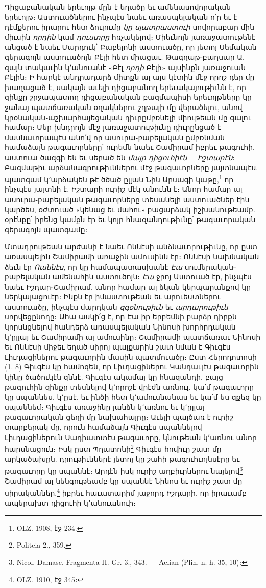 \documentclass{article}
\begin{document}
{Դիցաբանական երեւոյթ մըն է եղածը եւ ամենասովորական երեւոյթ։ Աստուածներու ինչպէս նաեւ առասպելական ո՛ր եւ է դէմքերու իրարու հետ ձուլումը \emph{կը սլատրաստուի} սովորաբար մին միւսին \emph{որդին} կամ \emph{դուստրը} հռչակելով։ Միեւնոյն յառաջատութենէ անցած է նաեւ Մարդուկ՝ Բաբելոնի աստուածը, որ յետոյ Սեմական գերագոյն աստուածոյն Բէլի հետ միացաւ. Թագղաթ֊բաղսար Ա. զայն տակաւին կ՚անուանէ «Բէլ \emph{որդի} Բէլի» այսինքն յառաջուան Բէլին։ Ի հարկէ անդրադարձ միտքն ալ այս կէտին մէջ որոշ դեր մը խաղացաձ է, սակայն աւելի դիցաբանող երեւակայութիւնն է, որ զինքը շրջապատող դիցաբանական բազմապիսի երեւոյթները կը ջանայ պատճառական օղակներու շղթայի մը վերածելու, անով կրօնական֊աշխարհայեցական դիւրըմբռնելի միութեան մը գալու համար։ Մեր խնդրոյն մէջ յառաջատութիւնը դիւրընցած է մասնաւորապէս անո՛վ որ ասուրա֊բաբելական ըմբռնման համաձայն թագաւորները՝ ուրեմն նաեւ Շամիրամ իբրեւ թագուհի, աստուա ծազգի են եւ սերած են \emph{մայր դիցուհիէն} = \emph{Իշտարէն}։ Բազմաթիւ արձանագրութիւններու մէջ թագաւորները յայտնապէս. պատգամ կ՚արձակեն թէ ծծած ըլլան Նին Արսագի կաթը,\footnote{OLZ. 1908, էջ 234.} որ ինչպէս յայտնի է, Իշտարի ուրիշ մէկ անունն է։ Անոր համար ալ ասուրա֊բաբելական թագաւորները տեսանելի աստուածներ էին կարծես, օժտուած «կենաց եւ մահու» բացարձակ իշխանութեամբ. օրէնքը՝ իրենց կամքն էր եւ կոյր հնազանդութիւնը՝ թագաւորական գերագոյն պատգամը։

Մտադրութեան արժանի է նաեւ Ոննէսի անձնաւորութիւնը, որ ըստ առասպելին Շամիրամի առաջին ամուսինն էր։ Ոննէսի նախնական ձեւն էր \emph{Ոաննէս}, որ կը համապատասխանէ \emph{Էա} սումերական֊բաբելական ամենահին աստուծոյն։ \emph{Էա} ջրոյ Աստուած էր, ինչպէս նաեւ Իշդար֊Շամիրամ, անոր համար ալ ձկան կերպարանքով կը ներկայացուէր։ Ինքն էր իմաստութեան եւ արուեստներու աստուածը, ինչպէս մարդկան \emph{զգօնութիւն} եւ \emph{արդարութիւն} սորվեցընողը։ Ահա ասկի՛ց է, որ Էա իր երբեմնի բարձր դիրքն կորսնցնելով հանդերձ առասպելական Նինոսի խորհրդական կ՚ըլլայ եւ Շամիրամի ալ ամուսինը։ Շամիրամի պատճառաւ Նինոսի եւ Ոննէսի միջեւ եղած սիրոյ պայքարին շատ նման է Գիւգէս Լիւդացիներու թագաւորին մասին պատմուածը։ Ըստ Հերոդոտոսի (1. 8) Գիւգէս կը համոզեն, որ Լիւդացիներու Կանդաւլէս թագաւորին կինը ծածուկէն զննէ. Գիւգէս ակամայ կը հնազանդի, բայց թագուհին զինքը տեսնելով կ՚որոշէ վրէժն առնուլ. կա՛մ թագաւորը կը սպաննես, կ՚ըսէ, եւ ինծի հետ կ՚ամուսնանաս եւ կա՛մ ես զքեզ կը սպաննեմ։ Գիւգէս առաջինը յանձն կ՚առնու եւ կ՚ըլլայ թագաւորական ցեղի մը նախահայրը։ Աւելի պայծառ է ուրիշ տարբերակ մը, որուն համաձայն Գիւգէս սպաննելով Լիւդացիներուն Սադիատտէս թագաւորը, կնութեան կ՚առնու անոր հարսնացուն։ Իսկ ըստ Պղատոնի\footnote{Politeia 2., 359.} Գիւգէս հովիւը շատ մը արկածախըն. դրութիւններէ յետոյ կը շահի թագուհւոյնսէրը եւ թագաւորը կը սպաննէ։ Արդէն իսկ ուրիշ աղբիւրներու նայելով\footnote{Nicol. Damasc. Fragmenta H. Gr. 3., 343. — Aelian (Plin. n. h. 35, 10)։} Շամիրամ ալ նենգութեամբ կը սպաննէ Նինոս եւ ուրիշ շատ մը սիրականներ,\footnote{OLZ. 1910, էջ 345։} իբրեւ հաւատարիմ յաջորդ Իշդարի, որ իրաւամբ ապերախտ դիցուհի կ՚անուանուի։

}
\end{document}
